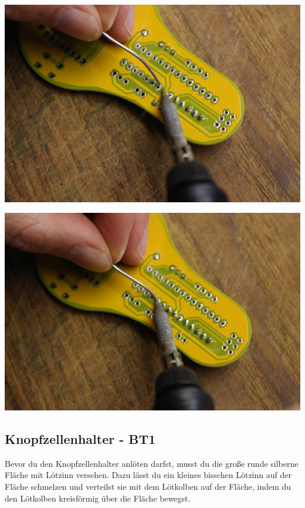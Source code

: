 \documentclass{article}
\begin{document}
\begin{minipage}[b]{0.5\textwidth}
	\includegraphics[width=\textwidth]{Bilder/IMG_5559.JPG}
	\label{fig:}
\end{minipage}
\begin{minipage}[b]{0.5\textwidth}
	\includegraphics[width=\textwidth]{Bilder/IMG_5560.JPG}
	\label{fig:}
\end{minipage}

\subsection{Knopfzellenhalter - BT1}

Bevor du den Knopfzellenhalter anlöten darfst, musst du die große runde silberne Fläche mit Lötzinn versehen. Dazu lässt du ein kleines bisschen Lötzinn auf der Fläche schmelzen und verteilst sie mit dem Lötkolben auf der Fläche, indem du den Lötkolben kreisförmig über die Fläche bewegst.
\end{document}
